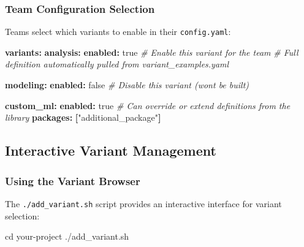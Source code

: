 \documentclass[
]{article}
\newenvironment{Shaded}{\begin{snugshade}}{\end{snugshade}}
\newcommand{\AttributeTok}[1]{\textcolor[rgb]{0.13,0.29,0.53}{#1}}
\newcommand{\BuiltInTok}[1]{#1}
\newcommand{\CharTok}[1]{\textcolor[rgb]{0.31,0.60,0.02}{#1}}
\newcommand{\CommentTok}[1]{\textcolor[rgb]{0.56,0.35,0.01}{\textit{#1}}}
\newcommand{\ExtensionTok}[1]{#1}
\newcommand{\FunctionTok}[1]{\textcolor[rgb]{0.13,0.29,0.53}{\textbf{#1}}}
\newcommand{\KeywordTok}[1]{\textcolor[rgb]{0.13,0.29,0.53}{\textbf{#1}}}
\newcommand{\NormalTok}[1]{#1}
\newcommand{\StringTok}[1]{\textcolor[rgb]{0.31,0.60,0.02}{#1}}
\begin{document}
\subsubsection{Team Configuration
Selection}\label{team-configuration-selection}

Teams select which variants to enable in their \texttt{config.yaml}:

\begin{Shaded}
\begin{Highlighting}[]
\FunctionTok{variants}\KeywordTok{:}
\AttributeTok{  }\FunctionTok{analysis}\KeywordTok{:}
\AttributeTok{    }\FunctionTok{enabled}\KeywordTok{:}\AttributeTok{ }\CharTok{true}\CommentTok{    \# Enable this variant for the team}
\CommentTok{    \# Full definition automatically pulled from variant\_examples.yaml}

\AttributeTok{  }\FunctionTok{modeling}\KeywordTok{:}
\AttributeTok{    }\FunctionTok{enabled}\KeywordTok{:}\AttributeTok{ }\CharTok{false}\CommentTok{   \# Disable this variant (won\textquotesingle{}t be built)}

\AttributeTok{  }\FunctionTok{custom\_ml}\KeywordTok{:}
\AttributeTok{    }\FunctionTok{enabled}\KeywordTok{:}\AttributeTok{ }\CharTok{true}
\CommentTok{    \# Can override or extend definitions from the library}
\AttributeTok{    }\FunctionTok{packages}\KeywordTok{:}\AttributeTok{ }\KeywordTok{[}\StringTok{"additional\_package"}\KeywordTok{]}
\end{Highlighting}
\end{Shaded}

\subsection{Interactive Variant
Management}\label{interactive-variant-management}

\subsubsection{Using the Variant
Browser}\label{using-the-variant-browser}

The \texttt{./add\_variant.sh} script provides an interactive interface
for variant selection:

\begin{Shaded}
\begin{Highlighting}[]
\BuiltInTok{cd}\NormalTok{ your{-}project}
\ExtensionTok{./add\_variant.sh}
\end{Highlighting}
\end{Shaded}
\end{document}
